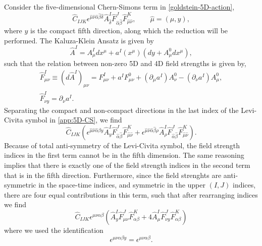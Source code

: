 \documentclass[12pt,twoside]{book}
\begin{document}
\begin{appendices}
Consider the five-dimensional Chern-Simons term in \eqref{goldstein-5D-action},
\begin{equation}\label{app:5D-CS}
\hat{C}_{IJK}\epsilon^{\hat{\mu}\hat{\nu}\hat{\alpha}\hat{\beta}\hat{\delta}}
\hat{A}^{I}_{\hat{\delta}} \hat{F}^{J}_{\hat{\alpha}\hat{\beta}} \hat{F}^{K}_{\hat{\mu}\hat{\nu}},
\qquad \hat{\mu} = (\mu,y),
\end{equation}
where $y$ is the compact fifth direction, along which the reduction will be performed. The Kaluza-Klein Ansatz is given by
\begin{equation}
\hat{A}^{I} = A^{I}_{\mu} dx^{\mu} + a^{I}(x^{\mu})(dy + A^{0}_{\mu} dx^{\mu}),
\end{equation}
such that the relation between non-zero 5D and 4D field strengths is given by,
\begin{gather}
\hat{F}^{I}_{\mu\nu} \equiv (d\hat{A}^{I})_{\mu\nu}
= F^{I}_{\mu\nu} + a^{I}F^{0}_{\mu\nu} + (\partial_{\mu} a^{I}) A^{0}_{\nu} - (\partial_{\nu} a^{I}) A^{0}_{\mu}, \label{FKK-1}\\
\hat{F}^{I}_{\nu y} = \partial_{\nu}a^{I}.\label{FKK-2}
\end{gather}
Separating the compact and non-compact directions in the last index of the Levi-Civita symbol in \eqref{app:5D-CS}, we find
\begin{equation}
\hat{C}_{IJK}\left( \epsilon^{\hat{\mu}\hat{\nu}\hat{\alpha}\hat{\beta}y}
\hat{A}^{I}_{y} \hat{F}^{J}_{\hat{\alpha}\hat{\beta}} \hat{F}^{K}_{\hat{\mu}\hat{\nu}}
+ \epsilon^{\hat{\mu}\hat{\nu}\hat{\alpha}\hat{\beta}\rho}
\hat{A}^{I}_{\rho} \hat{F}^{J}_{\hat{\alpha}\hat{\beta}} \hat{F}^{K}_{\hat{\mu}\hat{\nu}}
\right).
\end{equation}
Because of total anti-symmetry of the Levi-Civita symbol, the field strength indices in the first term cannot be in the fifth dimension. The same reasoning implies that there is exactly one of the field strength indices in the second term that is in the fifth direction. Furthermore, since the field strenghts are anti-symmetric in the space-time indices, and symmetric in the upper $(I,J)$ indices, there are four equal contributions in this term, such that after rearranging indices we find
\begin{equation}\label{general-CS5D}
\hat{C}_{IJK} \epsilon^{\mu\nu\alpha\beta} \left(
\hat{A}^{I}_{y} \hat{F}^{J}_{\mu\nu} \hat{F}^{K}_{\alpha\beta}
+ 4 \hat{A}^{I}_{\mu} \hat{F}^{J}_{\nu y} \hat{F}^{K}_{\alpha\beta}
\right)
\end{equation}
where we used the identification
\begin{equation}
\epsilon^{\mu\nu\alpha\beta y} = \epsilon^{\mu\nu\alpha\beta}.
\end{equation}


\end{appendices}
\end{document}
